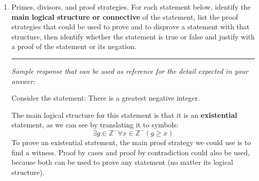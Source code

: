 \begin{enumerate}[labelindent=0pt, leftmargin=0pt]
    In this question, we'll consider the combination of these functions with a new function, one 
    that removes the element at the front of the list (if there is any). We define $remove: L \to L$
    by
    \[
        \begin{array}{ll}
            \textrm{Basis Step: } & remove([]) = [] \\
            \textrm{Recursive Step: } & \textrm{If } l \in L\textrm{ and }n \in \mathbb{N} \textrm{, then } remove(~(n, l)~) = l
        \end{array}        
    \]
    \begin{enumerate}
        \item What is the result of $remove(~append(~(prepend~(~(~(10,[]), 5~)~), 20)~)~)$? 
        For full credit, include all intermediate steps with brief justifications for each.
        \item Prove the statement
        \[
            \forall l \in L \left(~ remove( prepend(~(l,0)~)) = l ~\right) 
        \]
        \item Disprove the statement
        \[
            \forall l \in L \left(~ remove( append(~(l,0)~)) = l ~\right) 
        \]
    \end{enumerate}

    \item Primes, divisors, and proof strategies. For each statement below, identify the {\bf main logical structure or connective} of the 
    statement, list the proof strategies that could be used to prove and to disprove a statement with that structure, 
    then identify whether the statement is true or false and justify with a proof of the statement or its negation. 


    \rule{0.5\textwidth}{.4pt}
    
    {\it Sample response that can be used as reference for the detail expected 
    in your answer:} 

    Consider the statement: There is a greatest negative integer.

    The main logical structure for this statement is that it is an {\bf existential} statement, as we can 
    see by translating it to symbols: 
    \[
        \exists g \in \mathbb{Z}^{-} \forall x \in \mathbb{Z}^{-} ( g \geq x)
    \]
    To prove an existential statement, the main proof strategy we could use is to find a witness. 
    Proof by cases and proof by contradiction could also be used, because 
    both can be used to prove any statement (no matter its logical structure).


\end{enumerate}

